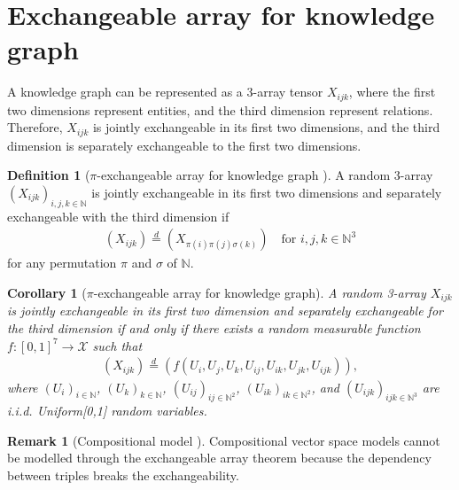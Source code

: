 \documentclass{article}
\newtheorem{corollary}{Corollary}[theorem] %
\theoremstyle{definition}
\newtheorem{definition}{Definition}
\newtheorem{remark}{Remark}
\begin{document}
\section{Exchangeable array for knowledge graph}

A knowledge graph can be represented as a 3-array tensor $X_{ijk}$, where the first two dimensions represent entities, and the third dimension represent relations. Therefore, $X_{ijk}$ is jointly exchangeable in its first two dimensions, and the third dimension is separately exchangeable to the first two dimensions.

\begin{definition}[$\pi$-exchangeable array for knowledge graph \citep{Orbanz2015}]A random 3-array $(X_{ijk})_{i,j,k\in \mathbb{N}}$ is jointly exchangeable in its first two dimensions and separately exchangeable with the third dimension if
\begin{align}
(X_{ijk}) \stackrel{d}{=} (X_{\pi(i)\pi(j)\sigma(k)}) \quad \text{for } i,j,k \in \mathbb{N}^3
\end{align}
for any permutation $\pi$ and $\sigma$ of $\mathbb{N}$.
\end{definition}


\begin{corollary}[$\pi$-exchangeable array for knowledge graph]
A random 3-array $X_{ijk}$ is jointly exchangeable in its first two dimension and separately exchangeable for the third dimension if and only if there exists a random measurable function $f:[0,1]^7 \rightarrow \mathcal{X}$ such that
\begin{align}
(X_{ijk})  \stackrel{d}{=} (f(U_i, U_j, U_k, U_{ij}, U_{ik}, U_{jk}, U_{ijk})),
\end{align}
where $(U_i)_{i\in \mathbb{N}}$, $(U_k)_{k\in \mathbb{N}}$, $(U_{ij})_{ij\in \mathbb{N}^2}$, $(U_{ik})_{ik\in \mathbb{N}^2}$, and $(U_{ijk})_{ijk\in \mathbb{N}^3}$  are i.i.d. Uniform[0,1] random variables.
\end{corollary}

\begin{remark}[Compositional model \citep{gu2015traversing}] Compositional vector space models cannot be modelled through the exchangeable array theorem because the dependency between triples breaks the exchangeability.
\end{remark}
\end{document}
